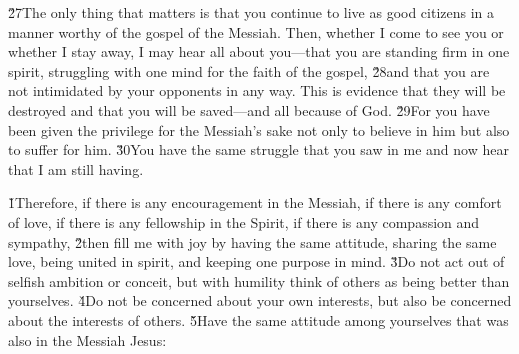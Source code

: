 \v{27}The only thing that matters is that you continue to live as good citizens in a manner worthy of the gospel of the Messiah. Then, whether I come to see you or whether I stay away, I may hear all about you---that you are standing firm in one spirit, struggling with one mind for the faith of the gospel, \v{28}and that you are not intimidated by your opponents in any way. This is evidence that they will be destroyed and that you will be saved---and all because of God. \v{29}For you have been given the privilege for the Messiah's sake not only to believe in him but also to suffer for him. \v{30}You have the same struggle that you saw in me and now hear that I am still having.

\v{1}Therefore, if there is any encouragement in the Messiah, if there is any comfort of love, if there is any fellowship in the Spirit, if there is any compassion and sympathy, \v{2}then fill me with joy by having the same attitude, sharing the same love, being united in spirit, and keeping one purpose in mind. \v{3}Do not act out of selfish ambition or conceit, but with humility think of others as being better than yourselves. \v{4}Do not be concerned about your own interests, but also be concerned about the interests of others. \v{5}Have the same attitude among yourselves that was also in the Messiah Jesus:

